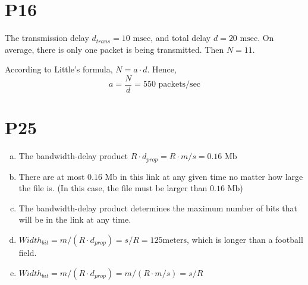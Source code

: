 \documentclass[a4paper, 11pt]{article}
\begin{document}
\section*{P16}
\hspace{14pt} The transmission delay $d_{trans} = 10 \text{ msec}$, and total delay $d = 20 \text{ msec}$. On average, there is only one packet is being transmitted. Then $N = 11$. 

According to Little's formula, $N = a \cdot d$. Hence, $$a = \frac{N}{d} = 550\text{ packets/sec}$$

\section*{P25}
	\begin{enumerate}[a.]
		\item The bandwidth-delay product $R \cdot d_{prop} = R \cdot m / s = 0.16\text{ Mb}$
		\item There are at most $0.16\text{ Mb}$ in this link at any given time no matter how large the file is. (In this case, the file must be larger than $0.16\text{ Mb}$)
		\item The bandwidth-delay product determines the maximum number of bits that will be in the link at any time.
		\item $Width_{bit} = m / (R \cdot d_{prop}) = s / R = 125 \text{meters}$, which is longer than a football field.
		\item $Width_{bit} = m / (R \cdot d_{prop}) =  m /(R \cdot m / s) = s / R$
	\end{enumerate}
\end{document}
